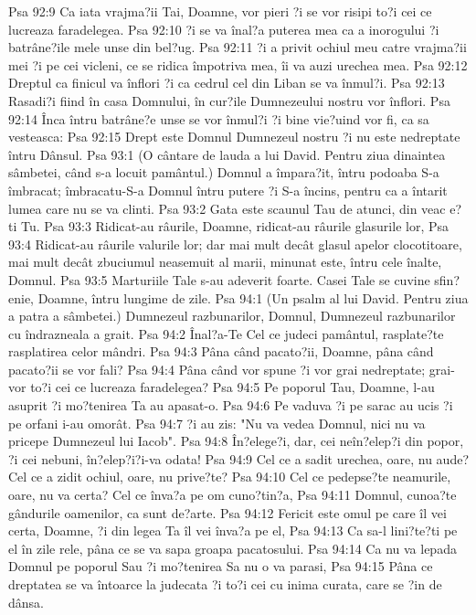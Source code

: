 Psa 92:9  Ca iata vrajma?ii Tai, Doamne, vor pieri ?i se vor risipi to?i cei ce lucreaza faradelegea.
Psa 92:10  ?i se va înal?a puterea mea ca a inorogului ?i batrâne?ile mele unse din bel?ug.
Psa 92:11  ?i a privit ochiul meu catre vrajma?ii mei ?i pe cei vicleni, ce se ridica împotriva mea, îi va auzi urechea mea.
Psa 92:12  Dreptul ca finicul va înflori ?i ca cedrul cel din Liban se va înmul?i.
Psa 92:13  Rasadi?i fiind în casa Domnului, în cur?ile Dumnezeului nostru vor înflori.
Psa 92:14  Înca întru batrâne?e unse se vor înmul?i ?i bine vie?uind vor fi, ca sa vesteasca:
Psa 92:15  Drept este Domnul Dumnezeul nostru ?i nu este nedreptate întru Dânsul.
Psa 93:1  (O cântare de lauda a lui David. Pentru ziua dinaintea sâmbetei, când s-a locuit pamântul.) Domnul a împara?it, întru podoaba S-a îmbracat; îmbracatu-S-a Domnul întru putere ?i S-a încins, pentru ca a întarit lumea care nu se va clinti.
Psa 93:2  Gata este scaunul Tau de atunci, din veac e?ti Tu.
Psa 93:3  Ridicat-au râurile, Doamne, ridicat-au râurile glasurile lor,
Psa 93:4  Ridicat-au râurile valurile lor; dar mai mult decât glasul apelor clocotitoare, mai mult decât zbuciumul neasemuit al marii, minunat este, întru cele înalte, Domnul.
Psa 93:5  Marturiile Tale s-au adeverit foarte. Casei Tale se cuvine sfin?enie, Doamne, întru lungime de zile.
Psa 94:1  (Un psalm al lui David. Pentru ziua a patra a sâmbetei.) Dumnezeul razbunarilor, Domnul, Dumnezeul razbunarilor cu îndrazneala a grait.
Psa 94:2  Înal?a-Te Cel ce judeci pamântul, rasplate?te rasplatirea celor mândri.
Psa 94:3  Pâna când pacato?ii, Doamne, pâna când pacato?ii se vor fali?
Psa 94:4  Pâna când vor spune ?i vor grai nedreptate; grai-vor to?i cei ce lucreaza faradelegea?
Psa 94:5  Pe poporul Tau, Doamne, l-au asuprit ?i mo?tenirea Ta au apasat-o.
Psa 94:6  Pe vaduva ?i pe sarac au ucis ?i pe orfani i-au omorât.
Psa 94:7  ?i au zis: "Nu va vedea Domnul, nici nu va pricepe Dumnezeul lui Iacob".
Psa 94:8  În?elege?i, dar, cei neîn?elep?i din popor, ?i cei nebuni, în?elep?i?i-va odata!
Psa 94:9  Cel ce a sadit urechea, oare, nu aude? Cel ce a zidit ochiul, oare, nu prive?te?
Psa 94:10  Cel ce pedepse?te neamurile, oare, nu va certa? Cel ce înva?a pe om cuno?tin?a,
Psa 94:11  Domnul, cunoa?te gândurile oamenilor, ca sunt de?arte.
Psa 94:12  Fericit este omul pe care îl vei certa, Doamne, ?i din legea Ta îl vei înva?a pe el,
Psa 94:13  Ca sa-l lini?te?ti pe el în zile rele, pâna ce se va sapa groapa pacatosului.
Psa 94:14  Ca nu va lepada Domnul pe poporul Sau ?i mo?tenirea Sa nu o va parasi,
Psa 94:15  Pâna ce dreptatea se va întoarce la judecata ?i to?i cei cu inima curata, care se ?in de dânsa.
